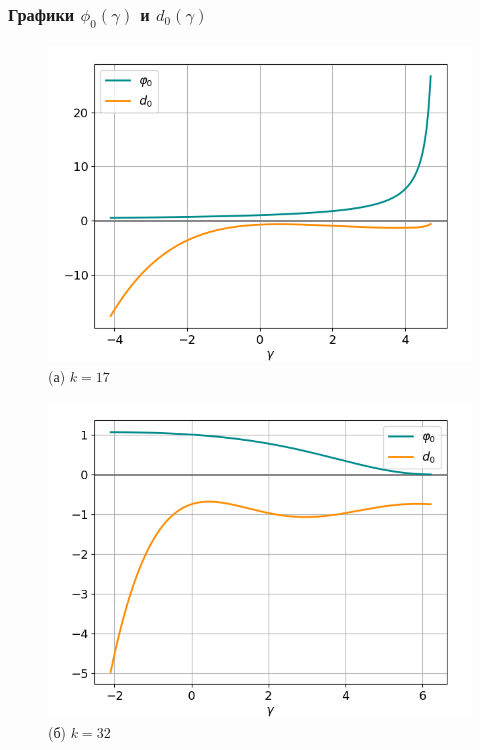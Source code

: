 \documentclass[fullscreen=true, unicode, bookmarks=false]{beamer}
\begin{document}
\begin{frame}
\frametitle{ Графики $ \phi_0(\gamma) $ и $ d_0(\gamma) $ }

\begin{figure} 
\begin{minipage}[h]{0.49\linewidth}
\begin{center}
\includegraphics[scale=0.39]{divergent_phi0d0_033.png} \\ (а) $ k=17 $
\end{center}
\end{minipage} 
\hfill
\begin{minipage}[h]{0.49\linewidth}
\begin{center}
\includegraphics[scale=0.39]{divergent_phi0d0_063.png}  \\ (б) $ k=32 $
\end{center}
\end{minipage} 
\end{figure}

\end{frame}
\end{document}
